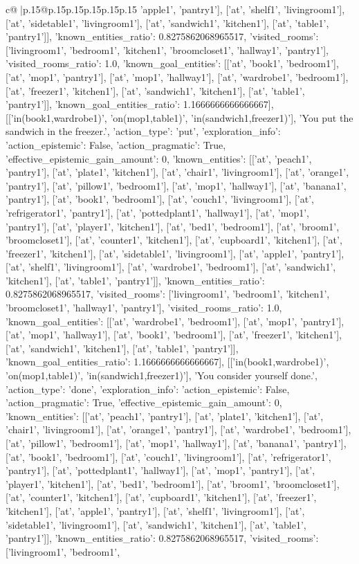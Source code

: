 \documentclass{article}
\begin{document}
{\begin{supertabular}{c@{$\;$}|p{.15\linewidth}@{}p{.15\linewidth}p{.15\linewidth}p{.15\linewidth}p{.15\linewidth}p{.15\linewidth}}
{{{'apple1', 'pantry1'], ['at', 'shelf1', 'livingroom1'], ['at', 'sidetable1', 'livingroom1'], ['at', 'sandwich1', 'kitchen1'], ['at', 'table1', 'pantry1']], 'known_entities_ratio': 0.8275862068965517, 'visited_rooms': ['livingroom1', 'bedroom1', 'kitchen1', 'broomcloset1', 'hallway1', 'pantry1'], 'visited_rooms_ratio': 1.0, 'known_goal_entities': [['at', 'book1', 'bedroom1'], ['at', 'mop1', 'pantry1'], ['at', 'mop1', 'hallway1'], ['at', 'wardrobe1', 'bedroom1'], ['at', 'freezer1', 'kitchen1'], ['at', 'sandwich1', 'kitchen1'], ['at', 'table1', 'pantry1']], 'known_goal_entities_ratio': 1.1666666666666667}}], [['in(book1,wardrobe1)', 'on(mop1,table1)', 'in(sandwich1,freezer1)'], 'You put the sandwich in the freezer.', {'action_type': 'put', 'exploration_info': {'action_epistemic': False, 'action_pragmatic': True, 'effective_epistemic_gain_amount': 0, 'known_entities': [['at', 'peach1', 'pantry1'], ['at', 'plate1', 'kitchen1'], ['at', 'chair1', 'livingroom1'], ['at', 'orange1', 'pantry1'], ['at', 'pillow1', 'bedroom1'], ['at', 'mop1', 'hallway1'], ['at', 'banana1', 'pantry1'], ['at', 'book1', 'bedroom1'], ['at', 'couch1', 'livingroom1'], ['at', 'refrigerator1', 'pantry1'], ['at', 'pottedplant1', 'hallway1'], ['at', 'mop1', 'pantry1'], ['at', 'player1', 'kitchen1'], ['at', 'bed1', 'bedroom1'], ['at', 'broom1', 'broomcloset1'], ['at', 'counter1', 'kitchen1'], ['at', 'cupboard1', 'kitchen1'], ['at', 'freezer1', 'kitchen1'], ['at', 'sidetable1', 'livingroom1'], ['at', 'apple1', 'pantry1'], ['at', 'shelf1', 'livingroom1'], ['at', 'wardrobe1', 'bedroom1'], ['at', 'sandwich1', 'kitchen1'], ['at', 'table1', 'pantry1']], 'known_entities_ratio': 0.8275862068965517, 'visited_rooms': ['livingroom1', 'bedroom1', 'kitchen1', 'broomcloset1', 'hallway1', 'pantry1'], 'visited_rooms_ratio': 1.0, 'known_goal_entities': [['at', 'wardrobe1', 'bedroom1'], ['at', 'mop1', 'pantry1'], ['at', 'mop1', 'hallway1'], ['at', 'book1', 'bedroom1'], ['at', 'freezer1', 'kitchen1'], ['at', 'sandwich1', 'kitchen1'], ['at', 'table1', 'pantry1']], 'known_goal_entities_ratio': 1.1666666666666667}}], [['in(book1,wardrobe1)', 'on(mop1,table1)', 'in(sandwich1,freezer1)'], 'You consider yourself done.', {'action_type': 'done', 'exploration_info': {'action_epistemic': False, 'action_pragmatic': True, 'effective_epistemic_gain_amount': 0, 'known_entities': [['at', 'peach1', 'pantry1'], ['at', 'plate1', 'kitchen1'], ['at', 'chair1', 'livingroom1'], ['at', 'orange1', 'pantry1'], ['at', 'wardrobe1', 'bedroom1'], ['at', 'pillow1', 'bedroom1'], ['at', 'mop1', 'hallway1'], ['at', 'banana1', 'pantry1'], ['at', 'book1', 'bedroom1'], ['at', 'couch1', 'livingroom1'], ['at', 'refrigerator1', 'pantry1'], ['at', 'pottedplant1', 'hallway1'], ['at', 'mop1', 'pantry1'], ['at', 'player1', 'kitchen1'], ['at', 'bed1', 'bedroom1'], ['at', 'broom1', 'broomcloset1'], ['at', 'counter1', 'kitchen1'], ['at', 'cupboard1', 'kitchen1'], ['at', 'freezer1', 'kitchen1'], ['at', 'apple1', 'pantry1'], ['at', 'shelf1', 'livingroom1'], ['at', 'sidetable1', 'livingroom1'], ['at', 'sandwich1', 'kitchen1'], ['at', 'table1', 'pantry1']], 'known_entities_ratio': 0.8275862068965517, 'visited_rooms': ['livingroom1', 'bedroom1', }}}
\end{supertabular}}
\end{document}
